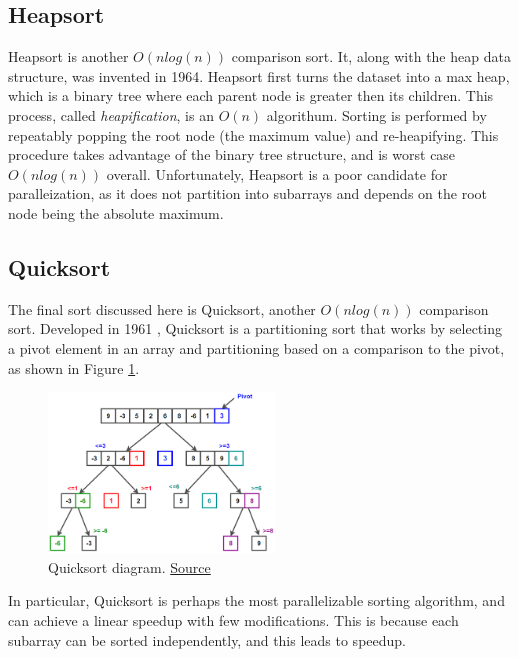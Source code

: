 \documentclass[conference]{IEEEtran}
\begin{document}
    
    \subsection{Heapsort}
    Heapsort is another $O(n log(n))$ comparison sort. 
    It, along with the heap data structure, was invented in 1964. \cite{forsythe_algorithms_1964}
    Heapsort first turns the dataset into a max heap, which is a binary tree where each parent node is greater then its children. 
    This process, called \textit{heapification}, is an $O(n)$ algorithum. 
    Sorting is performed by repeatably popping the root node (the maximum value) and re-heapifying. 
    This procedure takes advantage of the binary tree structure, and is worst case $O(n log (n))$ overall.  \cite{cormen_introduction_2009}
    Unfortunately, Heapsort is a poor candidate for paralleization, as it does not partition into subarrays and depends on the root node being the absolute maximum. 
    
    \subsection{Quicksort}
    The final sort discussed here is Quicksort, another $O(n log(n))$ comparison sort. 
    Developed in 1961 \cite{hoare_algorithm_1961}, Quicksort is a partitioning sort that works by selecting a pivot element in an array and partitioning based on a comparison to the pivot, as shown in Figure \ref{qck}. 
    \begin{figure}[h]
        \includegraphics[width=6cm]{Quicksort.png} 
        \caption{Quicksort diagram. \href{https://www.techiedelight.com/quicksort/}{Source}}
        \label{qck}
    \end{figure}
    In particular, Quicksort is perhaps the most parallelizable sorting algorithm, and can achieve a linear speedup with few modifications. \cite{blelloch_programming_1996}
    This is because each subarray can be sorted independently, and this leads to speedup. 
\end{document}
